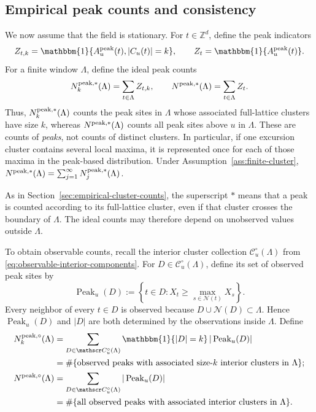 \documentclass[aap,preprint]{imsart}
\theoremstyle{plain}
\theoremstyle{definition}
\def\Z{{\mathbb Z}}
\begin{document}
\subsection{Empirical peak counts and consistency}
\label{sec:empirical-peak-counts}

We now assume that the field is stationary.  
For $t\in\Z^d$, define the peak indicators
\begin{equation}\label{eq:empirical-peak-indicators}
	Z_{t,k}
	=\mathbbm{1}\{A_u^{\rm peak}(t),|C_u(t)|=k\},
	\qquad
	Z_t=\mathbbm{1}\{A_u^{\rm peak}(t)\}.
\end{equation}
For a finite window $\Lambda$, define the ideal peak counts
\begin{equation}\label{eq:ideal-peak-counts}
	N_k^{{\rm peak},*}(\Lambda)
	=\sum_{t\in\Lambda}Z_{t,k},
	\qquad
	N^{{\rm peak},*}(\Lambda)
	=\sum_{t\in\Lambda}Z_t.
\end{equation}
Thus, $N_k^{{\rm peak},*}(\Lambda)$ counts the peak sites in $\Lambda$ whose
associated full-lattice clusters have size $k$, whereas
$N^{{\rm peak},*}(\Lambda)$ counts all peak sites above $u$ in $\Lambda$.
These are counts of \emph{peaks}, not counts of distinct clusters.  In
particular, if one excursion cluster contains several local maxima, it is
represented once for each of those maxima in the peak-based distribution.
Under Assumption~\ref{ass:finite-cluster}, $N^{{\rm peak},*}(\Lambda)
=\sum_{j=1}^{\infty}N_j^{{\rm peak},*}(\Lambda)$.

As in Section~\ref{sec:empirical-cluster-counts}, the superscript $*$ means
that a peak is counted according to its full-lattice cluster, even if that
cluster crosses the boundary of $\Lambda$.  The ideal counts may therefore
depend on unobserved values outside $\Lambda$.

To obtain observable counts, recall the interior cluster
collection $\mathscr C_u^\circ(\Lambda)$ from
\eqref{eq:observable-interior-components}.  For
$D\in\mathscr C_u^\circ(\Lambda)$, define its set of observed peak sites by
\begin{equation*}
	\operatorname{Peak}_u(D)
	:=
	\left\{
	t\in D:X_t\ge \max_{s\in\mathcal N(t)}X_s
	\right\}.
\end{equation*}
Every neighbor of every $t\in D$ is observed because
$D\cup\mathcal N(D)\subset\Lambda$.  Hence
$\operatorname{Peak}_u(D)$ and $|D|$ are both determined by the observations
inside $\Lambda$.  Define
\begin{equation}\label{eq:observable-peak-counts}
	\begin{split}
	N_k^{{\rm peak},\circ}(\Lambda)
	&=
	\sum_{D\in\mathscr C_u^\circ(\Lambda)}
	\mathbbm{1}\{|D|=k\}\,|\operatorname{Peak}_u(D)|\\
	&=\#\{\text{observed peaks with associated size-$k$ interior clusters in $\Lambda$}\};
	\\
	N^{{\rm peak},\circ}(\Lambda) 
	&=
	\sum_{D\in\mathscr C_u^\circ(\Lambda)}
	|\operatorname{Peak}_u(D)|\\
	&=\#\{\text{all observed peaks with associated interior clusters in $\Lambda$}\}.
	\end{split}
\end{equation}
\end{document}
